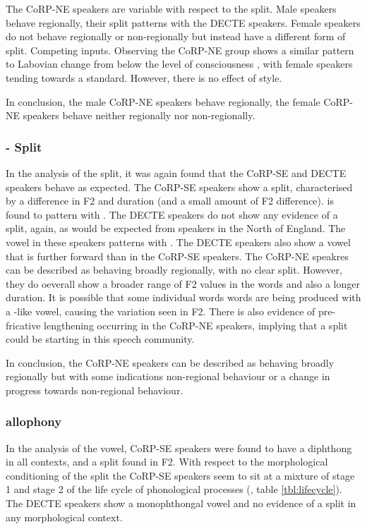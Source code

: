 \documentclass[../../00.FullDoc/tex/ThesisSkeleton-draft2]{subfiles}
\begin{document}
The CoRP-NE speakers are variable with respect to the \FS{} split. Male speakers behave regionally, their \FS{} split patterns with the DECTE speakers. Female speakers do not behave regionally or non-regionally but instead have a different form of split. Competing inputs. Observing the CoRP-NE group shows a similar pattern to Labovian change from below the level of consciousness , with female speakers tending towards a standard. However, there is no effect of style.

In conclusion, the male CoRP-NE speakers behave regionally, the female CoRP-NE speakers behave neither regionally nor non-regionally.

\subsubsection{- Split}
In the analysis of the \TB{} split, it was again found that the CoRP-SE and DECTE speakers behave as expected.
The CoRP-SE speakers show a \TB{} split, characterised by a difference in F2 and duration (and a small amount of F2 difference).  is found to pattern with \palm{}. The DECTE speakers do not show any evidence of a split, again, as would be expected from speakers in the North of England. The \bath{} vowel in these speakers patterns with \trap{}. The DECTE speakers also show a \palm{} vowel that is further forward than in the CoRP-SE speakers. The CoRP-NE speakres can be described as behaving broadly regionally, with no clear \TB{} split. However, they do oeverall show a broader range of F2 values in the \bath{} words and also a longer duration. It is possible that some individual words \bath{} words are being produced with a \palm{}-like vowel, causing the variation seen in F2. There is also evidence of pre-fricative lengthening occurring in the CoRP-NE speakers, implying that a split could be starting in this speech community.

In conclusion, the CoRP-NE speakers can be described as behaving broadly regionally but with some indications non-regional behaviour or a change in progress towards non-regional behaviour.

\subsubsection{ allophony}
In the analysis of the \goat{} vowel, CoRP-SE speakers were found to have a diphthong in all contexts, and a \GG{} split found in F2. With respect to the morphological conditioning of the \GG{} split the CoRP-SE speakers seem to sit at a mixture of stage 1 and stage 2 of the life cycle of phonological processes (\citealt{BermudezOtero2015a}, table \ref{tbl:lifecycle}). The DECTE speakers show a monophthongal \goat{} vowel and no evidence of a \GG{} split in any morphological context.
\end{document}
